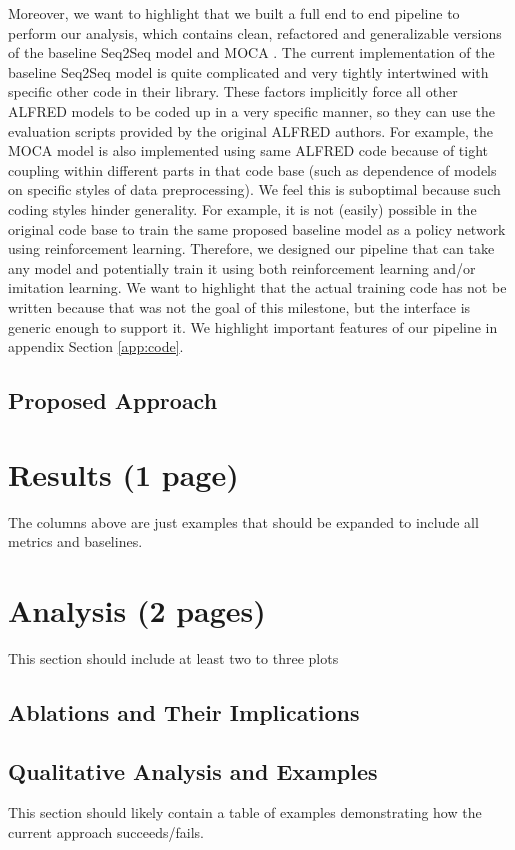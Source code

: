 \documentclass[11pt,a4paper]{article}
\begin{document}
Moreover, we want to highlight that we built a full end to end pipeline to perform our analysis, which contains clean, refactored and generalizable  versions of the baseline Seq2Seq model \cite{shridhar2020alfred} and MOCA \cite{singh2020moca}. The current implementation of the baseline Seq2Seq model \cite{shridhar2020alfred} is quite complicated and very tightly intertwined with specific other code in their library. These factors implicitly force all other ALFRED models to be coded up in a very specific manner, so they can use the evaluation scripts provided by the original ALFRED authors. For example, the MOCA model is also implemented using same ALFRED code because of tight coupling within different parts in that code base (such as dependence of models on specific styles of data preprocessing).  We feel this is suboptimal because such coding styles hinder generality. For example, it is not (easily) possible in the original code base to train the same proposed baseline model as a policy network using reinforcement learning. Therefore, we designed our pipeline that can take any model and potentially train it using both reinforcement learning and/or imitation learning. We want to highlight that the actual training code has not be written because that was not the goal of this milestone, but the interface is generic enough to support it. We highlight important features of our pipeline in appendix Section \ref{app:code}.

\subsection{Proposed Approach}

\clearpage

\section{Results (1 page)}
The columns above are just examples that should be expanded to include all metrics and baselines.

\clearpage
\section{Analysis (2 pages)}
This section should include at least two to three plots
\subsection{Ablations and Their Implications}

\subsection{Qualitative Analysis and Examples}
This section should likely contain a table of examples demonstrating how the current approach succeeds/fails.
\end{document}
